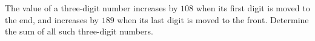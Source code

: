 The value of a three-digit number increases by $108$ when its first digit is moved to the end, and increases by $189$ when its last digit is moved to the front. Determine the sum of all such three-digit numbers.
